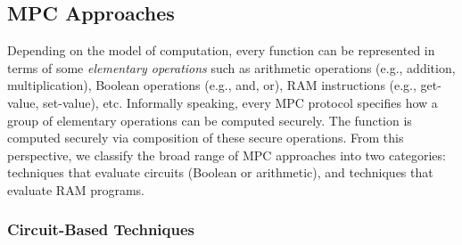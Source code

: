 \documentclass[10pt]{article}
\theoremstyle{plain}
\begin{document}
\subsection{MPC Approaches}

Depending on the model of computation, every function can be represented
in terms of some \emph{elementary operations} such as arithmetic operations
(e.g., addition, multiplication), Boolean operations (e.g., and, or),
RAM instructions (e.g., get-value, set-value), etc. Informally speaking,
every MPC protocol specifies how a group of elementary operations
can be computed securely. The function is computed securely via composition
of these secure operations. From this perspective, we classify the
broad range of MPC approaches into two categories: techniques that
evaluate circuits (Boolean or arithmetic), and techniques that evaluate
RAM programs.

\subsubsection{Circuit-Based Techniques}
\end{document}
